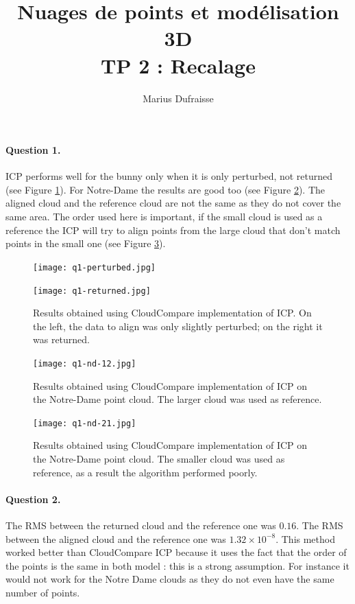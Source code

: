 \documentclass[french]{article}
\begin{document}
\title{Nuages de points et modélisation 3D\\
TP 2 : Recalage}
\author{Marius Dufraisse}
\date{}

\maketitle


\paragraph{Question 1.} 
ICP performs well for the bunny only when it is only perturbed, not returned (see Figure \ref{fig:q1-bunny}). For Notre-Dame the results are good too (see Figure \ref{fig:q1-nd12}). The aligned cloud and the reference cloud are not the same as they do not cover the same area. The order used here is important, if the small cloud is used as a reference the ICP will try to align points from the large cloud that don't match points in the small one (see Figure \ref{fig:q1-nd21}). 

\begin{figure}[h]
	\centering
	\begin{minipage}{0.45\linewidth}
		\centering
		\texttt{[image: q1-perturbed.jpg]}
	\end{minipage}\hfill
	\begin{minipage}{0.45\linewidth}
		\centering
		\texttt{[image: q1-returned.jpg]}
	\end{minipage}
	\caption{Results obtained using CloudCompare implementation of ICP. On the left, the data to align was only slightly perturbed; on the right it was returned.}
	\label{fig:q1-bunny}
\end{figure}

\begin{figure}[h]
	\centering
	\texttt{[image: q1-nd-12.jpg]}
	\caption{Results obtained using CloudCompare implementation of ICP on the Notre-Dame point cloud. The larger cloud was used as reference.}
	\label{fig:q1-nd12}
\end{figure}

\begin{figure}[h]
	\centering
	\texttt{[image: q1-nd-21.jpg]}
	\caption{Results obtained using CloudCompare implementation of ICP on the Notre-Dame point cloud. The smaller cloud was used as reference, as a result the algorithm performed poorly.}
	\label{fig:q1-nd21}
\end{figure}

\paragraph{Question 2.} The RMS between the returned cloud and the reference one was $0.16$. The RMS between the aligned cloud and the reference one was $1.32\times 10^{-8}$. This method worked better than CloudCompare ICP because it uses the fact that the order of the points is the same in both model : this is a strong assumption. For instance it would not work for the Notre Dame clouds as they do not even have the same number of points.
\end{document}

